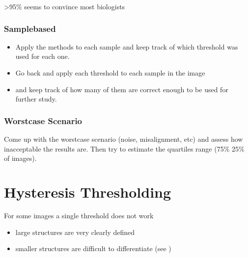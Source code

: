 \documentclass[letterpaper,10pt,english]{sphinxmanual}
\begin{document}
\sphinxAtStartPar
{} \textgreater{}95\% seems to convince most biologists


\subsection{Sample\sphinxhyphen{}based}
\label{\detokenize{05-AdvancedSegmentation:sample-based}}\begin{itemize}
\item {} 
\sphinxAtStartPar
Apply the methods to each sample and keep track of which threshold was used for each one.

\item {} 
\sphinxAtStartPar
Go back and apply each threshold to each sample in the image

\item {} 
\sphinxAtStartPar
and keep track of how many of them are correct enough to be used for further study.

\end{itemize}


\subsection{Worst\sphinxhyphen{}case Scenario}
\label{\detokenize{05-AdvancedSegmentation:worst-case-scenario}}
\sphinxAtStartPar
Come up with the worst\sphinxhyphen{}case scenario (noise, misalignment, etc) and assess how inacceptable the results are. Then try to estimate the quartiles range (75\% \sphinxhyphen{} 25\% of images).


\chapter{Hysteresis Thresholding}
\label{\detokenize{05-AdvancedSegmentation:hysteresis-thresholding}}
\sphinxAtStartPar
For some images a single threshold does not work
\begin{itemize}
\item {} 
\sphinxAtStartPar
large structures are very clearly defined

\item {} 
\sphinxAtStartPar
smaller structures are difficult to differentiate (see )

\end{itemize}

\sphinxAtStartPar
{}
\end{document}
